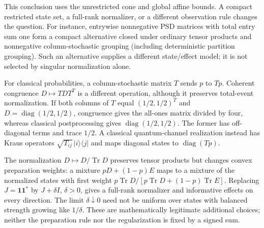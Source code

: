 This conclusion uses the unrestricted cone and global affine bounds. A compact restricted state set, a full-rank normalizer, or a different observation rule changes the question. For instance, entrywise nonnegative PSD matrices with total entry sum one form a compact alternative closed under ordinary tensor products and nonnegative column-stochastic grouping (including deterministic partition grouping). Such an alternative supplies a different state/effect model; it is not selected by singular normalization alone.

For classical probabilities, a column-stochastic matrix $T$ sends $p$ to $Tp$. Coherent congruence $D\mapsto TDT^T$ is a different operation, although it preserves total-event normalization. If both columns of $T$ equal $(1/2,1/2)^T$ and $D=\operatorname{diag}(1/2,1/2)$, congruence gives the all-ones matrix divided by four, whereas classical postprocessing gives $\operatorname{diag}(1/2,1/2)$. The former has off-diagonal terms and trace $1/2$. A classical quantum-channel realization instead has Kraus operators $\sqrt{T_{ij}}\,|i\rangle\langle j|$ and maps diagonal states to $\operatorname{diag}(Tp)$.

The normalization $D\mapsto D/\operatorname{Tr}D$ preserves tensor products but changes convex preparation weights: a mixture $pD+(1-p)E$ maps to a mixture of the normalized states with first weight
$p\operatorname{Tr}D/[p\operatorname{Tr}D+(1-p)\operatorname{Tr}E]$.
Replacing $J=\mathbf1\mathbf1^*$ by $J+\delta I$, $\delta>0$, gives a full-rank normalizer and informative effects on every direction. The limit $\delta\downarrow0$ need not be uniform over states with balanced strength growing like $1/\delta$. These are mathematically legitimate additional choices; neither the preparation rule nor the regularization is fixed by a signed sum.

